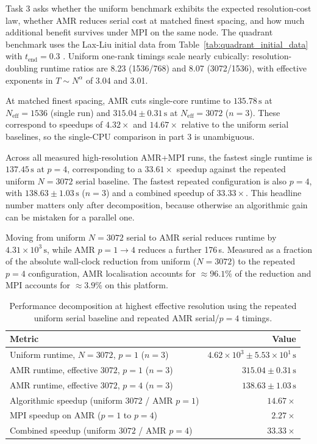 \documentclass[final,3p,times,twocolumn]{elsarticle}
\newif\ifwithpaths
\DeclareRobustCommand{\pathnote}[1]{\ifwithpaths\textit{ [source: \nolinkurl{#1}]}\fi}
\begin{document}
Task 3 asks whether the uniform benchmark exhibits the expected resolution-cost law, whether AMR reduces serial cost at matched finest spacing, and how much additional benefit survives under MPI on the same node. The quadrant benchmark uses the Lax-Liu initial data from Table~\ref{tab:quadrant_initial_data} with $t_\mathrm{end}=0.3$ \cite{lax1998}. Uniform one-rank timings scale nearly cubically: resolution-doubling runtime ratios are 8.23 (1536/768) and 8.07 (3072/1536), with effective exponents in $T\sim N^\alpha$ of 3.04 and 3.01.

At matched finest spacing, AMR cuts single-core runtime to $135.78\,\mathrm{s}$ at $N_\mathrm{eff}=1536$ (single run) and $315.04\pm0.31\,\mathrm{s}$ at $N_\mathrm{eff}=3072$ ($n=3$). These correspond to speedups of $4.32\times$ and $14.67\times$ relative to the uniform serial baselines, so the single-CPU comparison in part 3 is unambiguous.

Across all measured high-resolution AMR+MPI runs, the fastest single runtime is $137.45\,\mathrm{s}$ at $p=4$, corresponding to a $33.61\times$ speedup against the repeated uniform $N=3072$ serial baseline. The fastest repeated configuration is also $p=4$, with $138.63\pm1.03\,\mathrm{s}$ ($n=3$) and a combined speedup of $33.33\times$. This headline number matters only after decomposition, because otherwise an algorithmic gain can be mistaken for a parallel one.

Moving from uniform $N=3072$ serial to AMR serial reduces runtime by $4.31\times10^3\,\mathrm{s}$, while AMR $p=1\to4$ reduces a further 176\,s. Measured as a fraction of the absolute wall-clock reduction from uniform ($N=3072$) to the repeated $p=4$ configuration, AMR localisation accounts for $\approx 96.1\%$ of the reduction and MPI accounts for $\approx 3.9\%$ on this platform.

\begin{table}[!htbp]
\centering
\small
\begin{tabularx}{\linewidth}{@{}X r@{}}
\hline
Metric & Value \\
\hline
Uniform runtime, $N=3072$, $p=1$ ($n=3$) & $4.62\times10^{3}\pm5.53\times10^{1}\,\mathrm{s}$ \\
AMR runtime, effective $3072$, $p=1$ ($n=3$) & $315.04\pm0.31\,\mathrm{s}$ \\
AMR runtime, effective $3072$, $p=4$ ($n=3$) & $138.63\pm1.03\,\mathrm{s}$ \\
Algorithmic speedup (uniform $3072$ / AMR $p=1$) & $14.67\times$ \\
MPI speedup on AMR ($p=1$ to $p=4$) & $2.27\times$ \\
Combined speedup (uniform $3072$ / AMR $p=4$) & $33.33\times$ \\
\hline
\end{tabularx}
\caption{Performance decomposition at highest effective resolution using the repeated uniform serial baseline and repeated AMR serial/$p=4$ timings.\pathnote{Task3/outputs/report_pack_task3/task3_summary.md}}
\label{tab:timing_decomposition}
\end{table}
\end{document}
